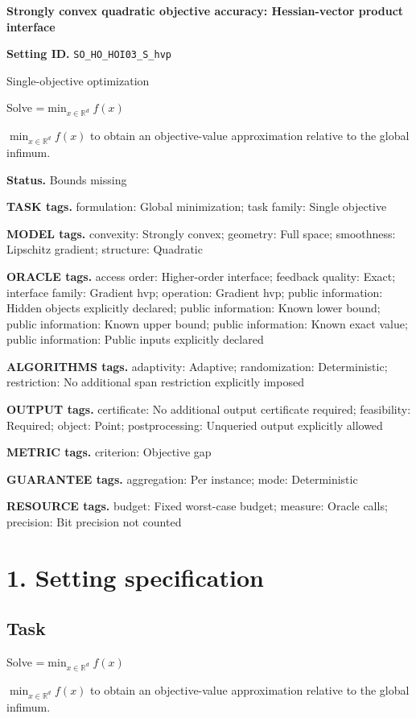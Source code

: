 \documentclass[10pt,a4paper]{article}
\newcommand{\AtlasMath}[1]{\par\begingroup\centering\setbox0=\hbox{$\displaystyle #1$}\ifdim\wd0>1.4\linewidth\typeout{ATLAS WIDE FORMULA: \the\wd0}\fi\ifdim\wd0>\linewidth\resizebox{\linewidth}{!}{\box0}\else\box0\fi\par\endgroup}
\newcommand{\AtlasInlineMath}[1]{\begingroup\setbox0=\hbox{$#1$}\ifdim\wd0>.4\linewidth\endgroup\AtlasMath{#1}\else\endgroup$#1$\fi}
\begin{document}
\raggedright

{\LARGE\bfseries\sffamily\color{AtlasNavy} Strongly convex quadratic objective accuracy: Hessian-vector product interface\par}\vspace{5pt}
\textbf{Setting ID.} \texttt{SO\_\allowbreak{}HO\_\allowbreak{}HOI03\_\allowbreak{}S\_\allowbreak{}hvp}

Single-objective optimization

Solve \AtlasInlineMath{\min_{x\in \mathbb{R}^d}f(x)} to obtain an objective-value approximation relative to the global infimum.

\textbf{Status.} Bounds missing

\textbf{TASK tags.} formulation: Global minimization; task family: Single objective

\textbf{MODEL tags.} convexity: Strongly convex; geometry: Full space; smoothness: Lipschitz gradient; structure: Quadratic

\textbf{ORACLE tags.} access order: Higher-order interface; feedback quality: Exact; interface family: Gradient hvp; operation: Gradient hvp; public information: Hidden objects explicitly declared; public information: Known lower bound; public information: Known upper bound; public information: Known exact value; public information: Public inputs explicitly declared

\textbf{ALGORITHMS tags.} adaptivity: Adaptive; randomization: Deterministic; restriction: No additional span restriction explicitly imposed

\textbf{OUTPUT tags.} certificate: No additional output certificate required; feasibility: Required; object: Point; postprocessing: Unqueried output explicitly allowed

\textbf{METRIC tags.} criterion: Objective gap

\textbf{GUARANTEE tags.} aggregation: Per instance; mode: Deterministic

\textbf{RESOURCE tags.} budget: Fixed worst-case budget; measure: Oracle calls; precision: Bit precision not counted

\section{1. Setting specification}
\subsection{Task}
Solve \AtlasInlineMath{\min_{x\in \mathbb{R}^d}f(x)} to obtain an objective-value approximation relative to the global infimum.
\end{document}
